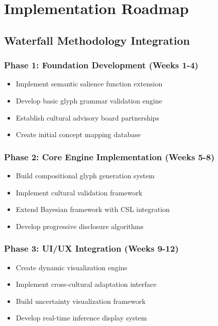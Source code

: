 \documentclass[12pt]{article}
\begin{document}
\section{Implementation Roadmap}

\subsection{Waterfall Methodology Integration}

\subsubsection{Phase 1: Foundation Development (Weeks 1-4)}
\begin{itemize}
    \item Implement semantic salience function extension
    \item Develop basic glyph grammar validation engine
    \item Establish cultural advisory board partnerships
    \item Create initial concept mapping database
\end{itemize}

\subsubsection{Phase 2: Core Engine Implementation (Weeks 5-8)}
\begin{itemize}
    \item Build compositional glyph generation system
    \item Implement cultural validation framework
    \item Extend Bayesian framework with CSL integration
    \item Develop progressive disclosure algorithms
\end{itemize}

\subsubsection{Phase 3: UI/UX Integration (Weeks 9-12)}
\begin{itemize}
    \item Create dynamic visualization engine
    \item Implement cross-cultural adaptation interface
    \item Build uncertainty visualization framework
    \item Develop real-time inference display system
\end{itemize}
\end{document}
